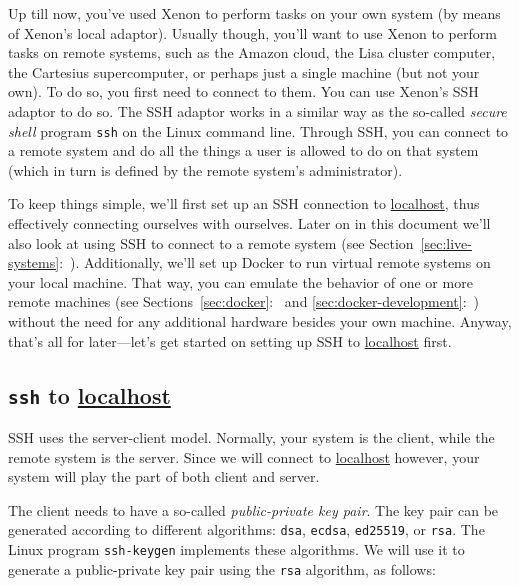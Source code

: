 \documentclass[12pt, a4paper, twoside, openany, titlepage]{book}
\begin{document}
Up till now, you've used Xenon to perform tasks on your own system (by means of Xenon's local adaptor). Usually though, you'll want to use Xenon to perform tasks on remote systems, such as the Amazon cloud, the Lisa cluster computer, the Cartesius supercomputer, or perhaps just a single machine (but not your own). To do so, you first need to connect to them. You can use Xenon's SSH adaptor to do so. The SSH adaptor works in a similar way as the so-called \textit{secure shell} program \texttt{ssh} on the Linux command line. Through SSH, you can connect to a remote system and do all the things a user is allowed to do on that system (which in turn is defined by the remote system's administrator).

To keep things simple, we'll first set up an SSH connection to \url{localhost}, thus effectively connecting ourselves with ourselves. Later on in this document we'll also look at using SSH to connect to a remote system (see Section~\ref{sec:live-systems}:~\textit{}). Additionally, we'll set up Docker to run virtual remote systems on your local machine. That way, you can emulate the behavior of one or more remote machines (see Sections~\ref{sec:docker}:~\textit{} and \ref{sec:docker-development}:~\textit{}) without the need for any additional hardware besides your own machine. Anyway, that's all for later---let's get started on setting up SSH to \url{localhost} first.

\subsection{\texttt{ssh} to \url{localhost}}

SSH uses the server-client model. Normally, your system is the client, while the remote system is the server. Since we will connect to \url{localhost} however, your system will play the part of both client and server.

The client needs to have a so-called \textit{public-private key pair}. The key pair can be generated according to different algorithms:
\texttt{dsa},
\texttt{ecdsa},
\texttt{ed25519}, or
\texttt{rsa}.
The Linux program \texttt{ssh-keygen} implements these algorithms. We will use it to generate a public-private key pair using the \texttt{rsa} algorithm, as follows:
\end{document}

